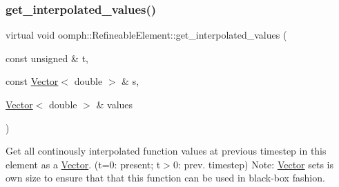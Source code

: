 \subsubsection{\texorpdfstring{get\+\_\+interpolated\+\_\+values()}{get\_interpolated\_values()}\hspace{0.1cm}{\footnotesize\ttfamily [2/2]}}
{\footnotesize\ttfamily virtual void oomph\+::\+Refineable\+Element\+::get\+\_\+interpolated\+\_\+values (\begin{DoxyParamCaption}\item[{const unsigned \&}]{t,  }\item[{const \hyperlink{classoomph_1_1Vector}{Vector}$<$ double $>$ \&}]{s,  }\item[{\hyperlink{classoomph_1_1Vector}{Vector}$<$ double $>$ \&}]{values }\end{DoxyParamCaption})\hspace{0.3cm}{\ttfamily [pure virtual]}}



Get all continously interpolated function values at previous timestep in this element as a \hyperlink{classoomph_1_1Vector}{Vector}. (t=0\+: present; t$>$0\+: prev. timestep) Note\+: \hyperlink{classoomph_1_1Vector}{Vector} sets is own size to ensure that that this function can be used in black-\/box fashion. 



